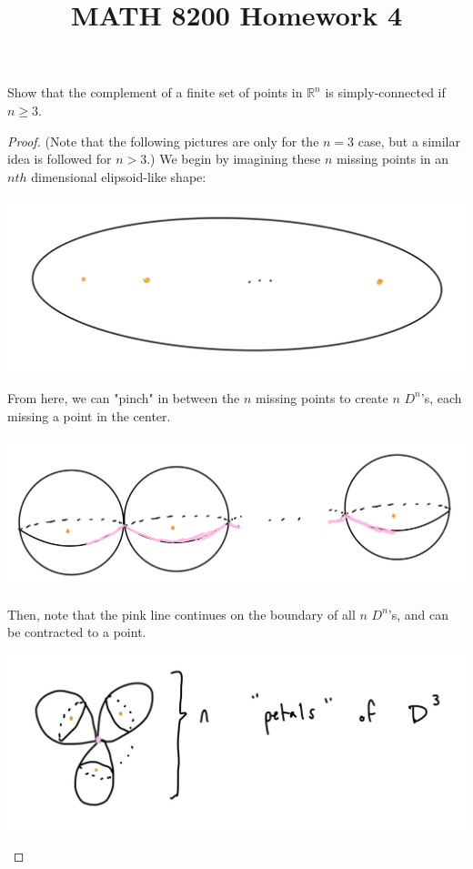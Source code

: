 \documentclass[12pt]{article}
\newenvironment{statement}[2][Statement]{\begin{trivlist}
\item[\hskip \labelsep {\bfseries #1}\hskip \labelsep {\bfseries #2.}]}{\end{trivlist}}
\begin{document}
 
\title{MATH 8200 Homework 4} 
\author{}
\maketitle

\begin{statement}[Problem]{1}
  Show that the complement of a finite set of points in $\mathbb{R}^n$ is simply-connected if $n \geq 3$. 
\end{statement}
\begin{proof}
  (Note that the following pictures are only for the $n=3$ case, but a similar idea is followed for $n >3$.) We begin by imagining these $n$ missing points in an $nth$ dimensional elipsoid-like shape:
  \par \begin{center} \includegraphics[scale=.2]{1-1.jpg} \end{center}
  \par From here, we can "pinch" in between the $n$ missing points to create $n$ $D^n$'s, each missing a point in the center.
  \par \begin{center} \includegraphics[scale=.2]{1-2.jpg} \end{center}
  \par Then, note that the pink line continues on the boundary of all $n$ $D^n$'s, and can be contracted to a point. 
  \par \begin{center} \includegraphics[scale=.2]{1-3.jpg} \end{center}

\end{proof}
\end{document}
